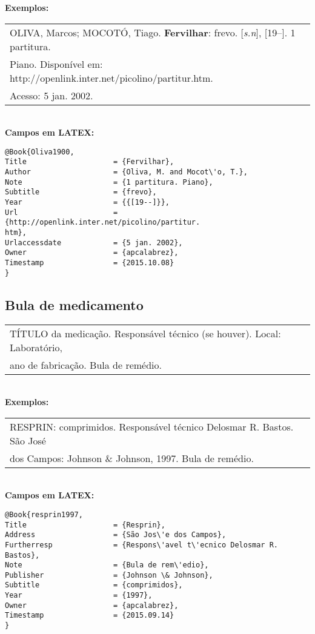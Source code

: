 \textbf{Exemplos:} \\

\begin{tabular}{|l|c|} \hline
	OLIVA, Marcos; MOCOTÓ, Tiago. \textbf{Fervilhar}: frevo. [\textit{s.n}], [19--]. 1 partitura.
	\\Piano. Disponível em: http://openlink.inter.net/picolino/partitur.htm.
	\\Acesso: 5 jan. 2002. 
	\\\hline
\end{tabular} \\

\textbf{Campos em LATEX:} 

\begin{verbatim}
@Book{Oliva1900,
Title                    = {Fervilhar},
Author                   = {Oliva, M. and Mocot\'o, T.},
Note                     = {1 partitura. Piano},
Subtitle                 = {frevo},
Year                     = {{[19--]}},
Url                      = {http://openlink.inter.net/picolino/partitur.
htm},
Urlaccessdate            = {5 jan. 2002},
Owner                    = {apcalabrez},
Timestamp                = {2015.10.08}
}
\end{verbatim}

\subsection{Bula de medicamento}

\begin{tabular}{|l|c|} \hline
	TÍTULO da medicação. Respons\'avel t\'ecnico (se houver). Local: Laboratório, \\ano de fabricação. Bula de rem\'edio. 
	\\\hline
\end{tabular} \\

\textbf{Exemplos:} \\

\begin{tabular}{|l|c|} \hline
	RESPRIN: comprimidos. Respons\'avel t\'ecnico Delosmar R. Bastos. São Jos\'e \\dos Campos: Johnson \& Johnson, 1997. Bula de rem\'edio. 
	\\\hline
\end{tabular} \\

\textbf{Campos em LATEX:} 

\begin{verbatim}
@Book{resprin1997,
Title                    = {Resprin},
Address                  = {São Jos\'e dos Campos},
Furtherresp              = {Respons\'avel t\'ecnico Delosmar R. Bastos},
Note                     = {Bula de rem\'edio},
Publisher                = {Johnson \& Johnson},
Subtitle                 = {comprimidos},
Year                     = {1997},
Owner                    = {apcalabrez},
Timestamp                = {2015.09.14}
}
\end{verbatim}

